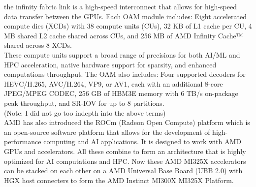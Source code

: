 \documentclass[12pt]{article}
\begin{document}
the infinity fabric link is a high-speed interconnect that allows for high-speed data transfer between the GPUs. Each OAM module includes: Eight accelerated compute dies (XCDs) with 38 compute units (CUs), 32 KB of L1 cache per CU, 4 MB shared L2 cache shared across CUs, and 256 MB of AMD Infinity Cache™ shared across 8 XCDs.\\
These compute units support a broad range of precisions for both AI/ML and HPC acceleration, native hardware support for sparsity, and enhanced computations throughput. The OAM also includes: Four supported decoders for HEVC/H.265, AVC/H.264, VP9, or AV1, each with an additional 8-core JPEG/MPEG CODEC, 256 GB of HBM3E memory with 6 TB/s on-package peak throughput, and SR-IOV for up to 8 partitions.\\
(Note: I did not go too indepth into the above terms)\\
AMD has also introduced the ROCm (Radeon Open Compute) platform which is an open-source software platform that allows for the development of high-performance computing and AI applications. It is designed to work with AMD GPUs and accelerators. All these combine to form an architecture that is highly optimized for AI computations and HPC. Now these AMD MI325X accelerators can be stacked on each other on a AMD Universal Base Board (UBB 2.0) with HGX host connecters to form the AMD Instinct MI300X MI325X Platform.
\end{document}
